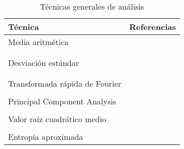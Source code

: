 \begin{table}
    \centering
    \caption{Técnicas generales de análisis}
    \label{tab:tec-generales}
    \begin{tabular}{ll}
        \toprule
        Técnica & Referencias \\
        \midrule
        Media aritmética & \cite{menz, hong} \\
                         & \cite{latt, punt} \\
                         & \cite{bruijn} \\
        Desviación estándar & \cite{menz, hong} \\
                            & \cite{latt, punt} \\
                            & \cite{bruijn} \\
        Transformada rápida de Fourier & \cite{menz, hong} \\
                                       & \cite{flora, punt} \\
        Principal Component Analysis & \cite{hong, razali} \\
                                     & \cite{flora, choi} \\
        Valor raíz cuadrático medio & \cite{dejnabadi, menz}\\
                                    & \cite{latt, mazza} \\
        Entropía aproximada         & \cite{arif} \\
        \bottomrule
    \end{tabular}
\end{table}


